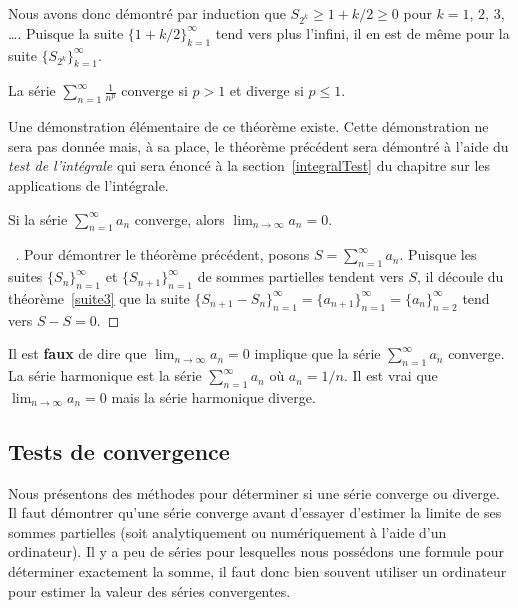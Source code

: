 {\begin{egg}[\theory\ \eng]
Nous avons donc démontré par induction que $S_{2^k} \geq 1 + k/2 \geq 0$
pour $k=1$, $2$, $3$, \ldots.  Puisque la suite
$\{1+k/2\}_{k=1}^\infty$ tend vers plus l'infini, il en est de même
pour la suite $\{S_{2^k}\}_{k=1}^\infty$.
\end{egg}

\begin{prop}
La série $\displaystyle \sum_{n=1}^\infty \frac{1}{n^p}$ converge si
$p>1$ et diverge si $p\leq 1$.
\label{Pseries}
\end{prop}

\begin{rmk}[\eng]
Une démonstration élémentaire de ce théorème existe.  Cette
démonstration ne sera pas donnée mais, à sa place, le théorème
précédent sera démontré à l'aide du {\em test de l'intégrale} qui sera
énoncé à la section~\ref{integralTest} du chapitre sur les
applications de l'intégrale.
\end{rmk}

\begin{theorem}
Si la série $\displaystyle \sum_{n=1}^\infty a_n$
converge, alors $\displaystyle \lim_{n\rightarrow \infty} a_n = 0$.
\label{condTC}
\end{theorem}

\begin{proof}[\UOproof\ \theory]
Pour démontrer le théorème précédent, posons
$\displaystyle S = \sum_{n=1}^\infty a_n$.  Puisque les suites
$\{S_n\}_{n=1}^\infty$ et $\{S_{n+1}\}_{n=1}^\infty$ de
sommes partielles tendent vers $S$, il découle du
théorème~\ref{suite3} que la suite
$\displaystyle \{S_{n+1}-S_n\}_{n=1}^\infty = \{ a_{n+1} \}_{n=1}^\infty
= \{ a_n \}_{n=2}^\infty$
tend vers $S-S=0$.
\end{proof}

\begin{rmk}
Il est {\bfseries faux} de dire que
$\displaystyle \lim_{n\rightarrow \infty} a_n = 0$ implique que la
série $\displaystyle \sum_{n=1}^\infty a_n$ converge.  La série
harmonique est la série $\displaystyle \sum_{n=1}^\infty a_n$ où
$a_n = 1/n$.  Il est vrai que
$\displaystyle \lim_{n\rightarrow \infty} a_n = 0$ mais la série
harmonique diverge.
\end{rmk}

\subsection{Tests de convergence \eng}\label{conv_tests}

Nous présentons des méthodes pour déterminer si une série converge ou
diverge.  Il faut démontrer qu'une série converge avant d'essayer
d'estimer la limite de ses sommes partielles (soit analytiquement ou
numériquement à l'aide d'un ordinateur).  Il y a peu de séries pour
lesquelles nous possédons une formule pour déterminer exactement la somme,
il faut donc bien souvent utiliser un ordinateur pour estimer la
valeur des séries convergentes.

}
